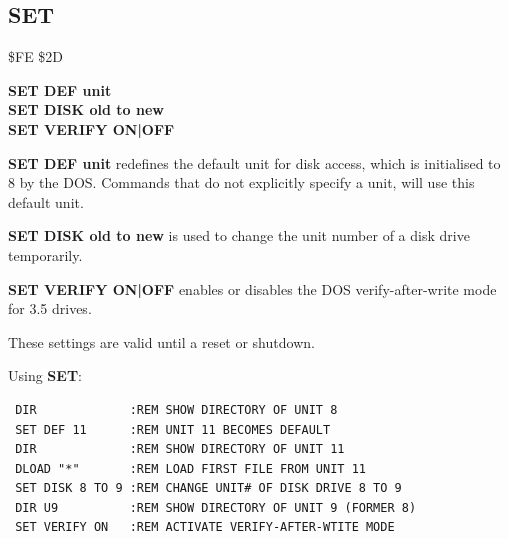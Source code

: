 
\newpage
\subsection{SET}
\begin{description}[leftmargin=2cm,style=nextline]
\item [Token:] \$FE \$2D
\item [Format:] {\bf SET DEF unit} \\
                {\bf SET DISK old to new} \\
                {\bf SET VERIFY ON|OFF}
\item [Usage:]  {\bf SET DEF unit} redefines the default unit
                for disk access, which is initialised to 8 by
                the DOS. Commands that do not explicitly
                specify a unit, will use this default unit.

                {\bf SET DISK old to new} is used to change
                the unit number of a disk drive temporarily.

                {\bf SET VERIFY ON|OFF} enables or disables
                the DOS verify-after-write mode for
                3.5 drives.

\item [Remarks:] These settings are valid until a reset
                 or shutdown.

\item [Examples:] Using {\bf SET}:
\begin{tcolorbox}[colback=black,coltext=white]
\verbatimfont{\codefont}
\begin{verbatim}
 DIR             :REM SHOW DIRECTORY OF UNIT 8
 SET DEF 11      :REM UNIT 11 BECOMES DEFAULT
 DIR             :REM SHOW DIRECTORY OF UNIT 11
 DLOAD "*"       :REM LOAD FIRST FILE FROM UNIT 11
 SET DISK 8 TO 9 :REM CHANGE UNIT# OF DISK DRIVE 8 TO 9
 DIR U9          :REM SHOW DIRECTORY OF UNIT 9 (FORMER 8)
 SET VERIFY ON   :REM ACTIVATE VERIFY-AFTER-WTITE MODE
\end{verbatim}
\end{tcolorbox}
\end{description}


\newpage
